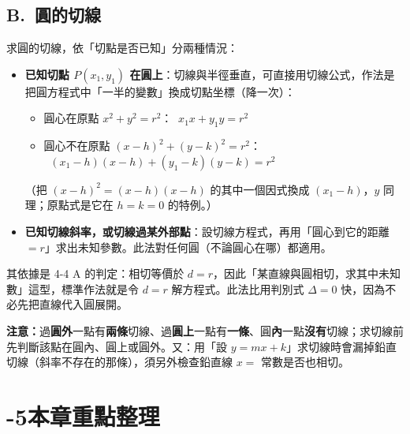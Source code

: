 \documentclass[11pt]{article}
\begin{document}
\subsection*{\sffamily B.\ 圓的切線}

求圓的切線，依「切點是否已知」分兩種情況：
\begin{itemize}\setlength{\itemsep}{2pt}
\item \textbf{已知切點 $P(x_1,y_1)$ 在圓上}：切線與半徑垂直，可直接用切線公式，作法是把圓方程式中「一半的變數」換成切點坐標（降一次）：
\begin{itemize}\setlength{\itemsep}{1pt}
\item 圓心在原點 $x^2+y^2=r^2$：$\;\boxed{\;x_1 x+y_1 y=r^2\;}$
\item 圓心不在原點 $(x-h)^2+(y-k)^2=r^2$：$\;\boxed{\;(x_1-h)(x-h)+(y_1-k)(y-k)=r^2\;}$
\end{itemize}
（把 $(x-h)^2=(x-h)(x-h)$ 的其中一個因式換成 $(x_1-h)$，$y$ 同理；原點式是它在 $h=k=0$ 的特例。）
\item \textbf{已知切線斜率，或切線過某外部點}：設切線方程式，再用「圓心到它的距離 $=r$」求出未知參數。此法對任何圓（不論圓心在哪）都適用。
\end{itemize}
其依據是 4-4 A 的判定：相切等價於 $d=r$，因此「某直線與圓相切，求其中未知數」這型，標準作法就是令 $d=r$ 解方程式。此法比用判別式 $\Delta=0$ 快，因為不必先把直線代入圓展開。

\textbf{注意：}過\textbf{圓外}一點有\textbf{兩條}切線、過\textbf{圓上}一點有\textbf{一條}、圓\textbf{內}一點\textbf{沒有}切線；求切線前先判斷該點在圓內、圓上或圓外。又：用「設 $y=mx+k$」求切線時會漏掉鉛直切線（斜率不存在的那條），須另外檢查鉛直線 $x=$ 常數是否也相切。

\section*{-5\quad 本章重點整理}
\end{document}
